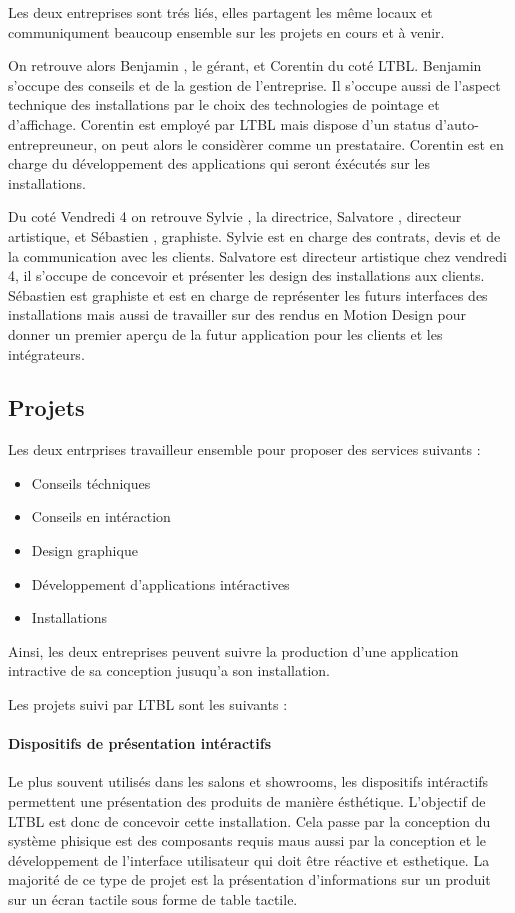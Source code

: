 \documentclass{article}
\begin{document}
Les deux entreprises sont trés liés, elles partagent les même locaux et communiqument beaucoup ensemble sur les projets en cours et à venir.

On retrouve alors Benjamin , le gérant, et Corentin  du coté LTBL.
Benjamin s'occupe des conseils et de la gestion de l'entreprise.
Il s'occupe aussi de l'aspect technique des installations par le choix des technologies de pointage et d'affichage.
Corentin est employé par LTBL mais dispose d'un status d'auto-entrepreuneur, on peut alors le considèrer comme un prestataire.
Corentin est en charge du développement des applications qui seront éxécutés sur les installations.

Du coté Vendredi 4 on retrouve Sylvie , la directrice, Salvatore , directeur artistique, et Sébastien , graphiste.
Sylvie est en charge des contrats, devis et de la communication avec les clients.
Salvatore est directeur artistique chez vendredi 4, il s'occupe de concevoir et présenter les design des installations aux clients.
Sébastien est graphiste et est en charge de représenter les futurs interfaces des installations mais aussi de travailler sur des rendus en Motion Design pour donner un premier aperçu de la futur application pour les clients et les intégrateurs.

\subsection{Projets}

Les deux entrprises travailleur ensemble pour proposer des services suivants :

\begin{itemize}
    \item Conseils téchniques
    \item Conseils en intéraction
    \item Design graphique
    \item Développement d'applications intéractives
    \item Installations
\end{itemize}

Ainsi, les deux entreprises peuvent suivre la production d'une application intractive de sa conception jusuqu'a son installation.

\medskip

Les projets suivi par LTBL sont les suivants :

\paragraph{Dispositifs de présentation intéractifs} Le plus souvent utilisés dans les salons et showrooms, les dispositifs intéractifs permettent une présentation des produits de manière ésthétique.
L'objectif de LTBL est donc de concevoir cette installation.
Cela passe par la conception du système phisique est des composants requis maus aussi par la conception et le développement de l'interface utilisateur qui doit être réactive et esthetique.
La majorité de ce type de projet est la présentation d'informations sur un produit sur un écran tactile sous forme de table tactile.
\end{document}
